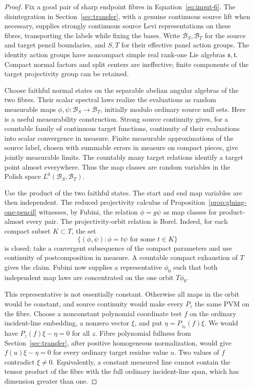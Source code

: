 \begin{proof}
Fix a good pair of sharp endpoint fibres in
Equation~\eqref{eq:input-6}.  The disintegration in
Section~\ref{sec:transfer}, with a genuine continuous source lift
when necessary, supplies strongly continuous source Levi
representations on these fibres, transporting the labels while
fixing the bases.  Write $\mathcal B_S,\mathcal B_T$ for the
source and target pencil boundaries, and $S,T$ for their
effective panel action groups.  The identity action groups have
noncompact simple real rank-one Lie algebras
$\mathfrak s,\mathfrak t$.  Compact normal factors and split
centers are ineffective; finite components of the target
projectivity group can be retained.

Choose faithful normal states on the separable abelian angular
algebras of the two fibres.  Their scalar spectral laws realize
the evaluations as random measurable maps
$\phi,\psi:\mathcal B_S\to\mathcal B_T$, initially modulo
ordinary source null sets.  Here is a useful measurability
construction.  Strong source continuity gives, for a countable
family of continuous target functions, continuity of their
evaluations into scalar convergence in measure.  Finite
measurable approximations of the source label, chosen with
summable errors in measure on compact pieces, give jointly
measurable limits.  The countably many target relations identify
a target point almost everywhere.  Thus the map classes are
random variables in the Polish space
$L^0(\mathcal B_S,\mathcal B_T)$.

Use the product of the two faithful states.  The start and end
map variables are then independent.  The reduced projectivity
calculus of Proposition~\ref{prop:gluing-one-pencil} witnesses,
by Fubini, the relation $\phi=g\psi$ as map classes for
product-almost every pair.  The projectivity-orbit relation is
Borel.  Indeed, for each compact subset $K\subset T$, the set
\[
 \{(\phi,\psi):\phi=t\psi\text{ for some }t\in K\}
\]
is closed: take a convergent subsequence of the compact parameters
and use continuity of postcomposition in measure.  A countable
compact exhaustion of $T$ gives the claim.  Fubini now supplies
a representative $\phi_0$ such that both independent map laws
are concentrated on the one orbit $T\phi_0$.

This representative is not essentially constant.  Otherwise all
maps in the orbit would be constant, and source continuity would
make every $P_z$ the same PVM on the fibre.  Choose a nonconstant
polynomial coordinate test $f$ on the ordinary incident-line
embedding, a nonzero vector $\xi$, and put
$\eta=P_{z_0}(f)\xi$.  We would have
$P_z(f)\xi-\eta=0$ for all $z$.  Fibre polynomial fullness from
Section~\ref{sec:transfer}, after positive homogeneous
normalization, would give $f(u)\xi-\eta=0$ for every ordinary
target residue value $u$.  Two values of $f$ contradict
$\xi\ne0$.  Equivalently, a constant measured line cannot
contain the tensor product of the fibre with the full
ordinary incident-line span, which has dimension greater than
one.


\end{proof}
